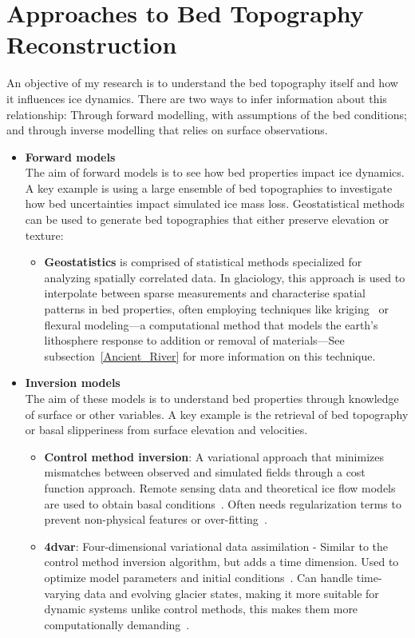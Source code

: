\section{Approaches to Bed Topography Reconstruction}
An objective of my research is to understand the bed topography itself and how it influences ice dynamics. There are two ways to infer information about this relationship: Through forward modelling, with assumptions of the bed conditions; and through inverse modelling that relies on surface observations.
\begin{itemize}
    \item\textbf{Forward models}\\
    The aim of forward models is to see how bed properties impact ice dynamics. A key example is using a large ensemble of bed topographies to investigate how bed uncertainties impact simulated ice mass loss. Geostatistical methods can be used to generate bed topographies that either preserve elevation or texture:    
    \begin{itemize}
            \item\textbf{Geostatistics} is comprised of statistical methods specialized for analyzing spatially correlated data. In glaciology, this approach is used to interpolate between sparse measurements and characterise spatial patterns in bed properties, often employing techniques like kriging~\cite{Mackie_2020} or flexural modeling—a computational method that models the earth's lithosphere response to addition or removal of materials—See subsection~\ref{Ancient_River} for more information on this technique.
    \end{itemize}
    \item\textbf{Inversion models}\\
    The aim of these models is to understand bed properties through knowledge of surface or other variables. A key example is the retrieval of bed topography or basal slipperiness from surface elevation and velocities.
        \begin{itemize}
            \item\textbf{Control method inversion}: A variational approach that minimizes mismatches between observed and simulated fields through a cost function approach. Remote sensing data and theoretical ice flow models are used to obtain basal conditions~\cite{deRydt_2013}. Often needs regularization terms to prevent non-physical features or over-fitting~\cite{Morlighem_Goldberg_2024}.
            \item\textbf{4dvar}: Four-dimensional variational data assimilation - Similar to the control method inversion algorithm, but adds a time dimension. Used to optimize model parameters and initial conditions~\cite{Morlighem_Goldberg_2024}. Can handle time-varying data and evolving glacier states, making it more suitable for dynamic systems unlike control methods, this makes them more computationally demanding~\cite{Morlighem_Goldberg_2024}.

\end{itemize}
\end{itemize}
